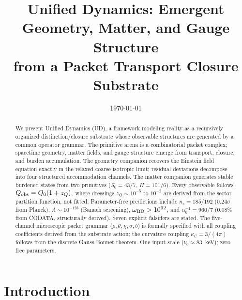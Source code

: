 \documentclass[11pt,twocolumn]{article}
\begin{document}
\title{Unified Dynamics: Emergent Geometry, Matter, and Gauge Structure\\from a Packet Transport Closure Substrate}


\date{\today}

\begin{abstract}
We present Unified Dynamics (UD), a framework modeling reality as a recursively organized distinction/closure substrate whose observable structures are generated by a common operator grammar.
The primitive arena is a combinatorial packet complex; spacetime geometry, matter fields, and gauge structure emerge from transport, closure, and burden accumulation.
The geometry companion recovers the Einstein field equation exactly in the relaxed coarse isotropic limit; residual deviations decompose into four structured accommodation channels.
The matter companion generates stable burdened states from two primitives ($S_0 = 43/7$, $H = 101/6$).
Every observable follows $Q_{\rm obs} = Q_0(1 + z_Q)$, where dressings $z_Q \sim 10^{-5}$ to $10^{-2}$ are derived from the sector partition function, not fitted.
Parameter-free predictions include $n_s = 185/192$ ($0.24\sigma$ from Planck), $\Lambda \sim 10^{-123}$ (Banach screening), $\omega_{\rm BD} > 10^{92}$, and $\alpha_0^{-1} = 960/7$ (0.08\% from CODATA, structurally derived).
Seven explicit falsifiers are stated.
The five-channel microscopic packet grammar ($\rho, \theta, \chi, \sigma, b$) is formally specified with all coupling coefficients derived from the substrate action; the curvature coupling $\kappa_C = 3/(4\pi)$ follows from the discrete Gauss-Bonnet theorem.
One input scale ($\nu_0 \approx 83$~keV); zero free parameters.
\end{abstract}

\maketitle


\section{Introduction}
\label{sec:intro}
\end{document}
